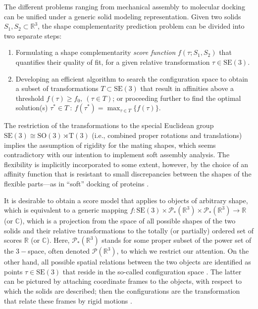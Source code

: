 \documentclass[article]{gmp2014}
\theoremstyle{definition}
\begin{document}
The different problems ranging from mechanical assembly to molecular docking can be unified under a generic solid modeling representation.
%
Given two solids $S_1, S_2 \subset \mathds{R}^3$, the shape complementarity prediction problem can be divided into two separate steps:
%
\begin{enumerate}
    \item Formulating a shape complementarity {\it score function} $f(\tau; S_1, S_2)$ that quantifies their quality of fit, for a given relative transformation $\tau \in \mathrm{SE}(3)$.
    \item Developing an efficient algorithm to search the configuration space to obtain a subset of transformations $T \subset \mathrm{SE}(3)$ that result in affinities above a threshold $f(\tau) \geq f_0, ~ (\tau \in T)$; or proceeding further to find the optimal solution(s) $\tau^\ast \in T ~:~ f(\tau^\ast) = \max_{\tau \in T} \{ f(\tau) \}$.
\end{enumerate}
%
The restriction of the transformations to the special Euclidean group $\mathrm{SE}(3) \cong \mathrm{SO}(3) \rtimes \mathrm{T}(3)$ (i.e., combined proper rotations and translations) implies the assumption of rigidity for the mating shapes, which seems contradictory with our intention to implement soft assembly analysis. The flexibility is implicitly incorporated to some extent, however, by the choice of an affinity function that is resistant to small discrepancies between the shapes of the flexible parts---as in ``soft'' docking of proteins \cite{Jiang1991}.

It is desirable to obtain a score model that applies to objects of arbitrary shape, which is equivalent to a generic mapping $f: \mathrm{SE}(3) \times \mathcal{P}_\ast(\mathds{R}^3) \times \mathcal{P}_\ast(\mathds{R}^3) \rightarrow \mathds{R}$ (or $\mathds{C}$), which is a projection from the space of all possible shapes of the two solids and their relative transformations to the totally (or partially) ordered set of scores $\mathds{R}$ (or $\mathds{C}$). Here, $\mathcal{P}_\ast(\mathds{R}^3)$ stands for some proper subset of the power set of the $3-$space, often denoted $\mathcal{P}(\mathds{R}^3)$, to which we restrict our attention. On the other hand, all possible spatial relations between the two objects are identified as points $\tau \in \mathrm{SE}(3)$ that reside in the so-called configuration space \cite{Lozano-Perez1983}. The latter can be pictured by attaching coordinate frames to the objects, with respect to which the solids are described; then the configurations are the transformation that relate these frames by rigid motions \cite{Latombe1991,Joskowicz1999}.
\end{document}
